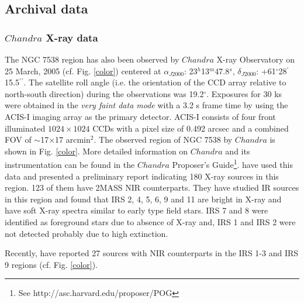 \documentclass[a4paper,fleqn,usenatbib,useAMS]{mnras}
\begin{document}
\subsection{Archival data}



\subsubsection{$Chandra$ X-ray data}

The NGC 7538 region has also been observed by $Chandra$ X-ray Observatory on 25 March, 2005 (cf. Fig. \ref{color}) 
centered
at $\alpha_{J2000}$: 23$^h$13$^m$47.8$^s$, $\delta_{J2000}$: +61$^\circ$28$^\prime$15.5$^\prime$$^\prime$.
The satellite roll angle (i.e. the orientation of the CCD array relative to north-south direction) during the observations was 19.2$^\circ$.
Exposures for 30 ks were obtained in the {\it very faint data mode}  with a 3.2 s frame time by 
using the ACIS-I imaging array as the primary 
detector. ACIS-I consists of four front illuminated $1024\times1024$ CCDs with a pixel size of 0.492 arcsec  and a combined 
FOV of $\sim$17$\times$17 arcmin$^2$. 
The observed region of NGC 7538 by $Chandra$ is shown in  Fig. \ref{color}.
More detailed information on $Chandra$  and its instrumentation can be found 
in the $Chandra$ Proposer's Guide\footnote{See http://asc.harvard.edu/proposer/POG}. 
\citet{2005prpl.conf.8307T} have used this data and presented a preliminary report
indicating 180 X-ray sources in this region. 123 of them have 2MASS NIR counterparts. 
They have studied IR sources in this region and found that IRS 2, 4, 5, 6, 9  and 11
are bright in X-ray and have soft X-ray spectra similar to early type field stars.
IRS 7 and 8  were identified as foreground stars due to absence of X-ray
and, IRS 1 and IRS 2 were not detected probably due to high extinction.

Recently, \citet{2014MNRAS.443.3218M} have reported 27 sources with NIR counterparts  
in the IRS 1-3 and IRS 9 regions (cf. Fig. \ref{color}).
\end{document}
